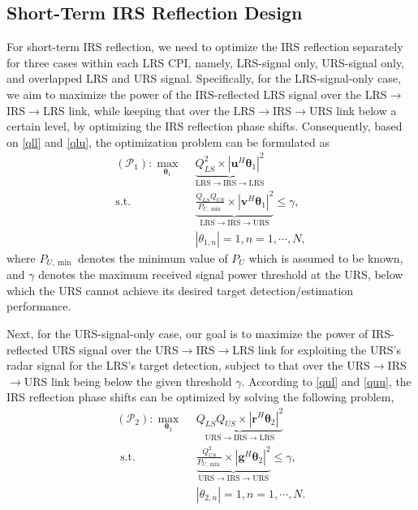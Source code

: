 \documentclass[10pt,final,doublecolumn]{IEEEtran}
\begin{document}
\subsection{Short-Term IRS Reflection Design}
For short-term IRS reflection, we need to optimize the IRS reflection separately for three cases within each LRS CPI, namely, LRS-signal only, URS-signal only, and overlapped LRS and URS signal. Specifically, for the LRS-signal-only case, we aim to maximize the power of the IRS-reflected LRS signal over the LRS$\rightarrow $IRS$\rightarrow$LRS link, while keeping that over the LRS$\rightarrow $IRS$\rightarrow$URS link below a certain level, by optimizing the IRS reflection phase shifts. Consequently, based on \eqref{qll} and \eqref{qlu}, the optimization problem can be formulated as
\begin{subequations}
\label{11}
\begin{align}
(\mathcal{P}_1): \mathop{\max}\limits_{\boldsymbol{\theta}_1}~&~ \underbrace{Q_{LS}^2\times |{\mathbf{u}}^H
\boldsymbol{\theta}_1|^2}_{\text{LRS}\rightarrow \text{IRS}\rightarrow \text{LRS}} \label{lo}
\\
\text {s.t.}~&~\underbrace{{\frac{Q_{LS}Q_{US}}{P_{U,\min}}\times|{\mathbf{v}}^H
\boldsymbol{\theta}_1|^2}}_{\text{LRS}\rightarrow \text{IRS}\rightarrow \text{URS}} \leq \gamma, \label{lo1}\\
~&~|{\theta}_{1,n}|= 1, n=1,\cdots,N,
\end{align}
\end{subequations}
where $P_{U,\min}$ denotes the minimum value of $P_{U}$ which is assumed to be known, and $\gamma$ denotes the maximum received signal power threshold at the URS, below which the URS cannot achieve its desired target detection/estimation performance.

Next, for the URS-signal-only case, our goal is to maximize
the power of IRS-reflected URS signal over the URS$\rightarrow $IRS$\rightarrow$LRS link for exploiting the URS's radar signal for the LRS's target detection, subject to
that over the URS$\rightarrow $IRS$\rightarrow$URS link being below the given threshold $\gamma$. According to \eqref{qul} and \eqref{quu}, the IRS reflection phase shifts can be optimized by solving the following problem,
\begin{subequations}
\label{22}
\begin{align}
(\mathcal{P}_2): \mathop{\max}\limits_{\boldsymbol{\theta}_2}~&~ \underbrace{Q_{LS}Q_{US}\times|{\mathbf{r}}^H
\boldsymbol{\theta}_2|^2}_{\text{URS}\rightarrow \text{IRS}\rightarrow \text{LRS}} \label{2lo1}
\\
\text { s.t. }~&~ \underbrace{{\frac{Q_{US}^2}{P_{U,\min}}\times|{\mathbf{g}}^H
\boldsymbol{\theta}_2|^2}}_{\text{URS}\rightarrow \text{IRS}\rightarrow \text{URS}}\leq \gamma,  \label{lo11}\\
~&~|{\theta}_{2,n}|= 1, n=1,\cdots,N.
\end{align}
\end{subequations}
\end{document}
